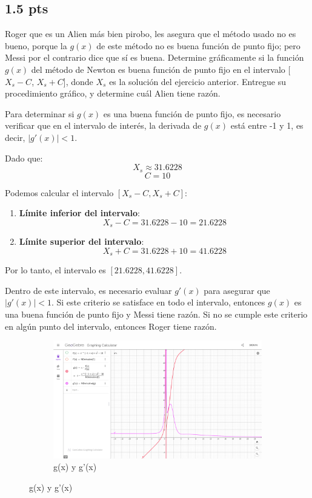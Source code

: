 \subsection{1.5 pts}

Roger que es un Alien más bien pirobo, les asegura que el método usado no es
bueno, porque la $g(x)$ de este método no es buena función de punto fijo; pero
Messi por el contrario dice que sí es buena. Determine gráficamente si la
función $g(x)$ del método de Newton es buena función de punto fijo en el
intervalo [$X_{s} - C$, $X_{s} + C$], donde $X_{s}$ es la solución del ejercicio
anterior. Entregue su procedimiento gráfico, y determine cuál Alien tiene razón.

Para determinar si \( g(x) \) es una buena función de punto fijo, es necesario verificar que en el intervalo de interés, la derivada de \( g(x) \) está entre -1 y 1, es decir, \( |g'(x)| < 1 \).

Dado que:
\[ X_s \approx 31.6228 \]
\[ C = 10 \]

Podemos calcular el intervalo \([X_s - C, X_s + C]\):

\begin{enumerate}
    \item \textbf{Límite inferior del intervalo}:
          \[ X_s - C = 31.6228 - 10 = 21.6228 \]
    \item \textbf{Límite superior del intervalo}:
          \[ X_s + C = 31.6228 + 10 = 41.6228 \]
\end{enumerate}

Por lo tanto, el intervalo es \([21.6228, 41.6228]\).

Dentro de este intervalo, es necesario evaluar \( g'(x) \) para asegurar que \( |g'(x)| < 1 \). Si este criterio se satisface en todo el intervalo, entonces \( g(x) \) es una buena función de punto fijo y Messi tiene razón. Si no se cumple este criterio en algún punto del intervalo, entonces Roger tiene razón.

\begin{figure}[H]
    \centering
    \begin{subfigure}[b]{\textwidth}
        \centering
        \includegraphics[width=\textwidth]{Figures/0. General/6.2.png}
        \caption{g(x) y g'(x)}
        \label{fig: g(x)}
    \end{subfigure}
\end{figure}

